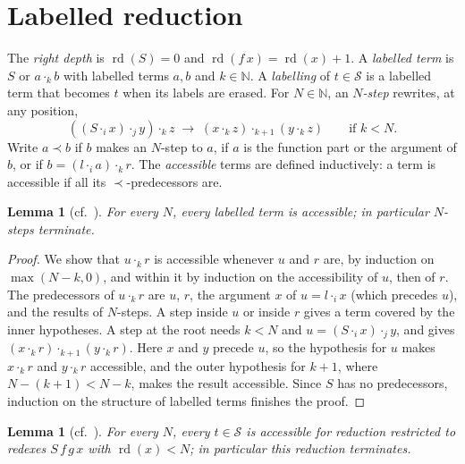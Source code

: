 \documentclass[11pt]{amsart}
\newtheorem{lemma}[theorem]{Lemma}
\newcommand{\Ter}{\mathcal S}
\newcommand{\rd}{\operatorname{rd}}
\newcommand{\lab}[1]{\mathbin{\cdot_{#1}}}
\begin{document}
\section{Labelled reduction}

The \emph{right depth} is $\rd(S)=0$ and $\rd(f\,x)=\rd(x)+1$. A \emph{labelled term} is $S$ or
$a\lab k b$ with labelled terms $a,b$ and $k\in\mathbb N$. A \emph{labelling} of $t\in\Ter$ is a labelled term that becomes $t$ when its labels are erased. For $N\in\mathbb N$, an \emph{$N$-step}
rewrites, at any position,
\[
  ((S\lab i x)\lab j y)\lab k z\;\to\;(x\lab k z)\lab{k+1}(y\lab k z)\qquad\text{if }k<N.
\]
Write $a\prec b$ if $b$ makes an $N$-step to $a$, if $a$ is the function part or the argument of
$b$, or if $b=(l\lab i a)\lab k r$. The \emph{accessible} terms are defined inductively: a term is accessible if all its
$\prec$-predecessors are.

\begin{lemma}[{cf.\ \citep[Thm.~8]{waldmann-ic}}]\label{lem:label}
For every $N$, every labelled term is accessible; in particular $N$-steps terminate.
\end{lemma}

\begin{proof}
We show that $u\lab k r$ is accessible whenever $u$ and $r$ are, by induction on $\max(N-k,0)$, and
within it by induction on the accessibility of $u$, then of $r$. The predecessors of $u\lab k r$ are
$u$, $r$, the argument $x$ of $u=l\lab i x$ (which precedes $u$), and the results of $N$-steps. A
step inside $u$ or inside $r$ gives a term covered by the inner hypotheses. A step at the root
needs $k<N$ and $u=(S\lab i x)\lab j y$, and gives $(x\lab k r)\lab{k+1}(y\lab k r)$. Here $x$ and $y$
precede $u$, so the hypothesis for $u$ makes $x\lab k r$ and $y\lab k r$ accessible, and the outer
hypothesis for $k+1$, where $N-(k+1)<N-k$, makes the result accessible. Since $S$ has no
predecessors, induction on the structure of labelled terms finishes the proof.
\end{proof}

\begin{lemma}[{cf.\ \citep[Thm.~16]{waldmann-ic}}]\label{lem:bounded}
For every $N$, every $t\in\Ter$ is accessible for reduction restricted to redexes $S\,f\,g\,x$
with $\rd(x)<N$; in particular this reduction terminates.
\end{lemma}
\end{document}
